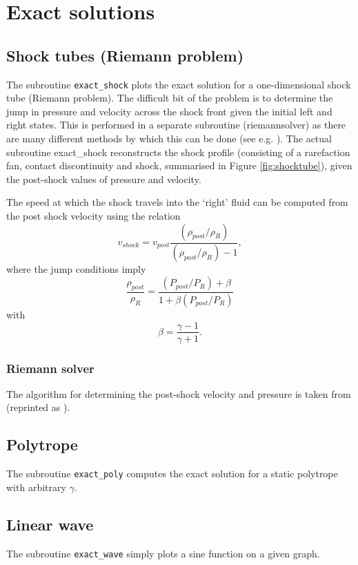 \documentclass[a4paper,12pt]{article}
\begin{document}
\section{Exact solutions}
\label{sec:exact}
\subsection{Shock tubes (Riemann problem)}
 The subroutine \verb+exact_shock+ plots the exact solution for a one-dimensional shock tube
(Riemann problem). The difficult bit of the problem is to determine the jump in
pressure and velocity across the shock front given the initial left and right
states. This is performed in a separate subroutine (riemannsolver) as there are 
many different methods by which this can be done (see e.g. \citealt{toro92}). 
The actual subroutine exact\_shock reconstructs the shock profile (consisting of
a rarefaction fan, contact discontinuity and shock, summarised in Figure
\ref{fig:shocktube}), given the post-shock values of pressure and
velocity. 

 The speed at which the shock travels into the `right' fluid can be computed from the post shock
velocity using the relation
\begin{equation}
v_{shock} = v_{post}\frac{(\rho_{post}/\rho_R)}{(\rho_{post}/\rho_R)- 1},
\end{equation}
where the jump conditions imply
\begin{equation}
\frac{\rho_{post}}{\rho_R} = \frac{(P_{post}/P_R) + \beta}{1 + \beta (P_{post}/P_R)}
\end{equation}
with
\begin{equation}
\beta = \frac{\gamma - 1}{\gamma + 1}.
\end{equation}

\subsubsection{Riemann solver}
 The algorithm for determining the post-shock velocity and pressure is taken
from \citet{vanleer79} (reprinted as \citealt{vanleer99}).


\subsection{Polytrope}
 The subroutine \verb+exact_poly+ computes the exact solution for a static polytrope with
arbitrary $\gamma$.

\subsection{Linear wave}
 The subroutine \verb+exact_wave+ simply plots a sine function on a given graph.
\end{document}
